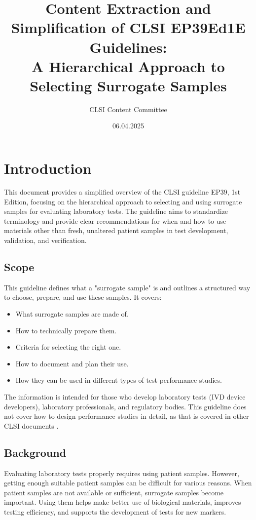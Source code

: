 \documentclass{article}
\title{Content Extraction and Simplification of CLSI EP39Ed1E Guidelines: \\ A Hierarchical Approach to Selecting Surrogate Samples}
\author{CLSI Content Committee}
\date{06.04.2025}
\begin{document}
\maketitle

\section{Introduction}

This document provides a simplified overview of the CLSI guideline EP39, 1st Edition, focusing on the hierarchical approach to selecting and using surrogate samples for evaluating laboratory tests. The guideline aims to standardize terminology and provide clear recommendations for when and how to use materials other than fresh, unaltered patient samples in test development, validation, and verification.

\subsection{Scope}

This guideline defines what a "surrogate sample" is and outlines a structured way to choose, prepare, and use these samples. It covers:
\begin{itemize}
    \item What surrogate samples are made of.
    \item How to technically prepare them.
    \item Criteria for selecting the right one.
    \item How to document and plan their use.
    \item How they can be used in different types of test performance studies.
\end{itemize}
The information is intended for those who develop laboratory tests (IVD device developers), laboratory professionals, and regulatory bodies. This guideline does not cover how to design performance studies in detail, as that is covered in other CLSI documents \cite{CLSIEP39Ed1E}.

\subsection{Background}

Evaluating laboratory tests properly requires using patient samples. However, getting enough suitable patient samples can be difficult for various reasons. When patient samples are not available or sufficient, surrogate samples become important. Using them helps make better use of biological materials, improves testing efficiency, and supports the development of tests for new markers.
\end{document}
